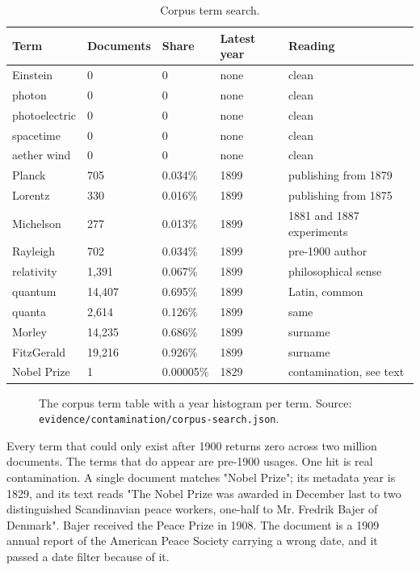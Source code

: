 \documentclass[reprint,prx,amsmath,amssymb,aps,superscriptaddress]{revtex4-2}
\begin{document}
\begin{table}[t]
\caption{Corpus term search.}
\begin{ruledtabular}
\begin{tabular}{lllll}
Term & Documents & Share & Latest year & Reading \\
\hline
Einstein & 0 & 0 & none & clean \\
photon & 0 & 0 & none & clean \\
photoelectric & 0 & 0 & none & clean \\
spacetime & 0 & 0 & none & clean \\
aether wind & 0 & 0 & none & clean \\
Planck & 705 & 0.034\% & 1899 & publishing from 1879 \\
Lorentz & 330 & 0.016\% & 1899 & publishing from 1875 \\
Michelson & 277 & 0.013\% & 1899 & 1881 and 1887 experiments \\
Rayleigh & 702 & 0.034\% & 1899 & pre-1900 author \\
relativity & 1,391 & 0.067\% & 1899 & philosophical sense \\
quantum & 14,407 & 0.695\% & 1899 & Latin, common \\
quanta & 2,614 & 0.126\% & 1899 & same \\
Morley & 14,235 & 0.686\% & 1899 & surname \\
FitzGerald & 19,216 & 0.926\% & 1899 & surname \\
Nobel Prize & 1 & 0.00005\% & 1829 & contamination, see text \\
\end{tabular}
\end{ruledtabular}
\end{table}

\begin{figure}[t]
\centering
{}
\caption{The corpus term table with a year histogram per term. Source: \texttt{evidence/contamination/corpus-search.json}.}
\label{fig:6}
\end{figure}

Every term that could only exist after 1900 returns zero across two million documents. The terms that do appear are pre-1900 usages. One hit is real contamination. A single document matches "Nobel Prize"; its metadata year is 1829, and its text reads "The Nobel Prize was awarded in December last to two distinguished Scandinavian peace workers, one-half to Mr. Fredrik Bajer of Denmark". Bajer received the Peace Prize in 1908. The document is a 1909 annual report of the American Peace Society carrying a wrong date, and it passed a date filter because of it.
\end{document}
